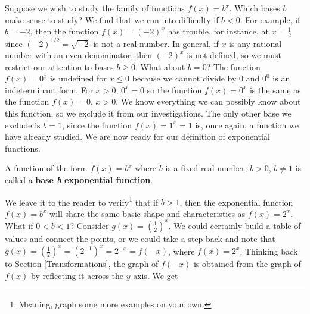 Suppose we wish to study the family of functions $f(x) = b^{x}$.  Which bases $b$ make sense to study?  We find that we run into difficulty if $b < 0$.  For example, if $b = -2$, then the function $f(x) = (-2)^{x}$ has trouble, for instance, at $x = \frac{1}{2}$ since $(-2)^{1/2} = \sqrt{-2}$ is not a real number. In general, if $x$ is any rational number with an even denominator, then $(-2)^{x}$ is not defined, so we must restrict our attention to bases $b \geq 0$.  What about $b = 0$?  The function $f(x) = 0^{x}$ is undefined for $x \leq 0$ because we cannot divide by $0$ and $0^{0}$ is an indeterminant form.  For $x > 0$, $0^{x} = 0$ so the function  $f(x) = 0^{x}$ is the same as the function $f(x) = 0$, $x > 0$.  \label{indeterminantformtwo} We know everything we can possibly know about this function, so we exclude it from our investigations.  The only other base we exclude is $b=1$, since the function $f(x) = 1^{x} = 1$ is, once again, a function we have already studied.  We are now ready for our definition of exponential functions.

\smallskip


\colorbox{ResultColor}{\bbm

\begin{defn} \label{expfcndefn}  A function of the form $f(x) = b^{x}$ where $b$ is a fixed real number, $b > 0$, $b \neq 1$ is called a \textbf{base \emph{b} exponential function}.

\end{defn}


\ebm}
\smallskip

We leave it to the reader to verify\footnote{Meaning, graph some more examples on your own.} that if $b > 1$, then the exponential function $f(x) = b^{x}$ will share the same basic shape and characteristics as $f(x) = 2^{x}$.  What if $0 < b < 1$?  Consider $g(x) = \left(\frac{1}{2}\right)^{x}$.  We could certainly build a table of values and connect the points, or we could take a step back and note that $g(x) = \left(\frac{1}{2}\right)^{x} = \left(2^{-1}\right)^{x} = 2^{-x} = f(-x)$, where $f(x) = 2^{x}$.  Thinking back to Section \ref{Transformations}, the graph of $f(-x)$ is obtained from the graph of $f(x)$ by reflecting it across the $y$-axis. We get

